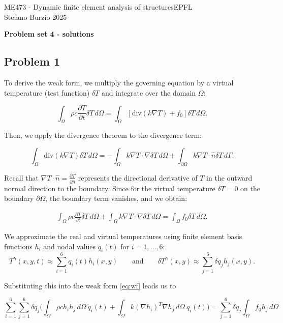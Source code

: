 \documentclass[12pt]{article}
\begin{document}
\noindent ME473 - Dynamic finite element analysis of structures\hfill EPFL\\
Stefano Burzio \hfill 2025\\
\vspace{0.3cm}

\hspace*{\fill}\textbf{\Large Problem set 4 - solutions}\hspace*{\fill}

\hrulefill

\subsection*{Problem 1}
To derive the weak form, we multiply the governing equation by a virtual temperature (test function) \( \delta T \) and integrate over the domain \(\Omega\):

\[
    \int_{\Omega} \rho c \frac{\partial T}{\partial t} \delta T \, d\Omega = \int_{\Omega} \left[ \text{div}(k \nabla T) + f_0 \right] \delta T \, d\Omega.
\]

Then, we apply the divergence theorem to the divergence term:

\[
    \int_{\Omega} \text{div}(k \nabla T) \delta T \, d\Omega = - \int_{\Omega} k \nabla T \cdot \nabla\delta T \, d\Omega + \int_{\partial \Omega} k \nabla T \cdot \hat{n} \delta T \, d\Gamma.
\]

Recall that $\nabla T \cdot \hat{n}=\frac{\partial T}{\partial \hat{n}}$ represents the directional derivative of $T$ in the outward normal direction to the boundary. Since for the virtual temperature \(\delta T = 0\) on the boundary \(\partial \Omega\), the boundary term vanishes, and we obtain:

\begin{eqnarray}
    \label{eq:wf}
    \int_{\Omega} \rho c \frac{\partial T}{\partial t}\delta T \, d\Omega + \int_{\Omega} k \nabla T \cdot \nabla \delta T \, d\Omega = \int_{\Omega} f_0 \delta T \, d\Omega.
\end{eqnarray}

We approximate the real and virtual temperatures using finite element basis functions \( h_i \) and nodal values \( q_i(t) \) for $i=1,\dots,6$:
\[
    T^h(x, y, t) \approx \sum_{i=1}^{6} q_i(t) h_i(x, y)\qquad \text{and}\qquad \delta T^h(x, y) \approx \sum_{j=1}^{6} \delta q_j h_j(x, y).
\]

Substituting this into the weak form \eqref{eq:wf} leads us to

\[
    \sum_{i=1}^{6} \sum_{j=1}^{6} \delta q_j\Big(\int_{\Omega} \rho c  h_i h_j \, d\Omega\ \dot{q}_i(t) + \int_{\Omega} k (\nabla h_i)^T \nabla h_j \, d\Omega\ q_i(t)\Big)= \sum_{j=1}^{6} \delta q_j \int_{\Omega} f_0  h_j \, d\Omega
\]
\end{document}
